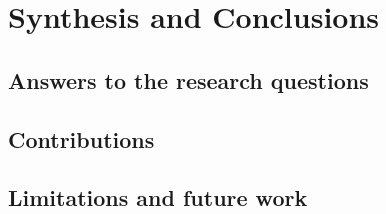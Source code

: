 \chapter{Synthesis and Conclusions}
\label{ch:synthesis}
\glsresetall
\clearpage   %

\section{Answers to the research questions}
\paragraph{} \lipsum[1][1-4]
\paragraph{} \lipsum[2][1-4]

\section{Contributions}
\begin{contribution}[Scientific]
    \lipsum[3][1-3]
\end{contribution}
\begin{contribution}[Societal]
    \lipsum[4][1-3]
\end{contribution}

\section{Limitations and future work}
\lipsum[5]
